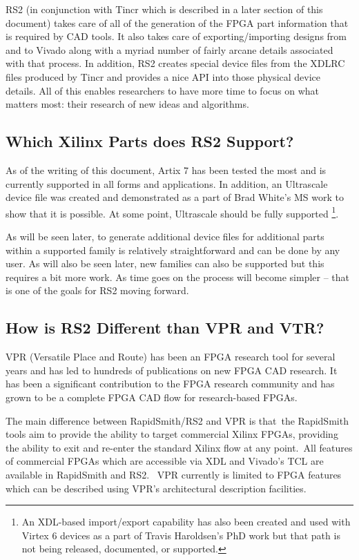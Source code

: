 \documentclass[12pt]{article}
\begin{document}
RS2 (in conjunction with Tincr which is described in a later section of this
document) takes care of all of the generation of the FPGA part information that
is required by CAD tools. It also takes care of exporting/importing designs from
and to Vivado along with a myriad number of fairly arcane details associated
with that process.  In addition, RS2 creates special device files from the XDLRC
files produced by Tincr and provides a nice API into those physical device
details.  All of this enables researchers to have more time to focus on what
matters most: their research of new ideas and algorithms.

\subsection{Which Xilinx Parts does RS2 Support?}
As of the writing of this document, Artix 7 has been tested the most and is
currently supported in all forms and applications.  In addition, an Ultrascale
device file was created and demonstrated as a part of Brad White’s MS work to
show that it is possible.  At some point, Ultrascale should be fully supported
\footnote{An XDL-based import/export capability has also been created and used
with Virtex 6 devices as a part of Travis Haroldsen’s PhD work but that path is
not being released, documented, or supported.}.

As will be seen later, to generate additional device files for additional parts
within a supported family is relatively straightforward and can be done by any
user.  As will also be seen later, new families can also be supported but this
requires a bit more work.  As time goes on the process will become simpler –
that is one of the goals for RS2 moving forward.

\subsection{How is RS2 Different than VPR and VTR?}
VPR (Versatile Place and Route) has been an FPGA research tool for several years
and has led to hundreds of publications on new FPGA CAD research.  It has been a
significant contribution to the FPGA research community and has grown to be a
complete FPGA CAD flow for research-based FPGAs.

The main difference between RapidSmith/RS2 and VPR is that the RapidSmith tools
aim to provide the ability to target commercial Xilinx FPGAs, providing the
ability to exit and re-enter the standard Xilinx flow at any point. All features
of commercial FPGAs which are accessible via XDL and Vivado’s TCL are available
in RapidSmith and RS2.  VPR currently is limited to FPGA features which can be
described using VPR's architectural description facilities.
\end{document}
